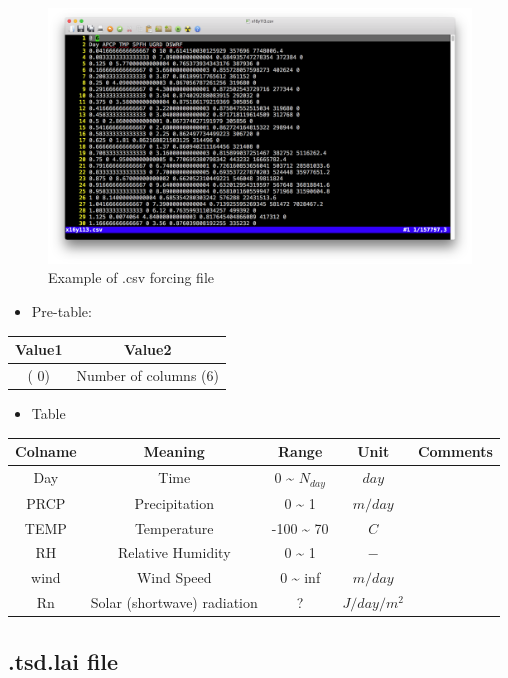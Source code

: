 \documentclass[
]{scrbook}
\providecommand{\tightlist}{%
  \setlength{\itemsep}{0pt}\setlength{\parskip}{0pt}}
\begin{document}
\begin{figure}
\centering
\includegraphics{Fig/IO/tsd.csv.png}
\caption{Example of .csv forcing file}
\end{figure}

\begin{itemize}
\tightlist
\item
  Pre-table:
\end{itemize}

\begin{longtable}[]{@{}cc@{}}
\toprule
Value1 & Value2\tabularnewline
\midrule
\endhead
( \(0\)) & Number of columns (\(6\))\tabularnewline
\bottomrule
\end{longtable}

\begin{itemize}
\tightlist
\item
  Table
\end{itemize}

\begin{longtable}[]{@{}ccccc@{}}
\toprule
Colname & Meaning & Range & Unit & Comments\tabularnewline
\midrule
\endhead
Day & Time & 0 \textasciitilde{} \(N_{day}\) & \(day\) &\tabularnewline
PRCP & Precipitation & 0 \textasciitilde{} 1 & \(m/day\) &\tabularnewline
TEMP & Temperature & -100 \textasciitilde{} 70 & \(C\) &\tabularnewline
RH & Relative Humidity & 0 \textasciitilde{} 1 & \(-\) &\tabularnewline
wind & Wind Speed & 0 \textasciitilde{} inf & \(m/day\) &\tabularnewline
Rn & Solar (shortwave) radiation & ? & \(J/day/m^2\) &\tabularnewline
\bottomrule
\end{longtable}

\hypertarget{tsd.lai-file}{%
\subsection{.tsd.lai file}\label{tsd.lai-file}}
\end{document}
